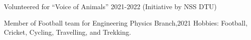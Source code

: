 



\begin{cvskills}
  \cvskill
    {} %
    {Volunteered for “Voice of Animals” 2021-2022 (Initiative by NSS DTU)} %

  \cvskill
    {} %
    {Member of Football team for Engineering Physics Branch,2021} %
  \cvskill
    {} %
    {Hobbies: Football, Cricket, Cycling, Travelling, and Trekking.} %
 
\end{cvskills}